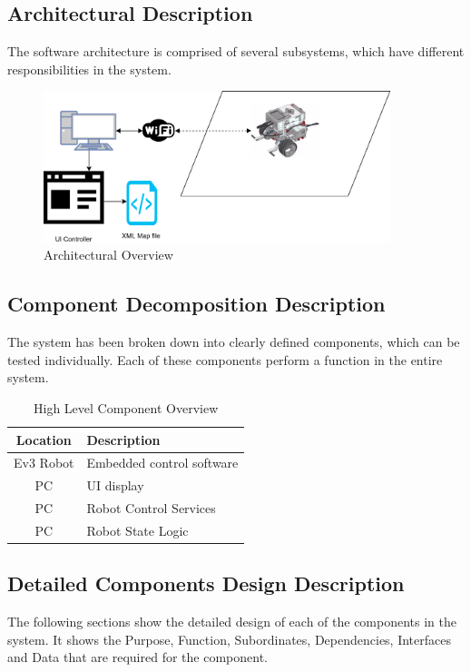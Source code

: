 \subsection{Architectural Description}
The software architecture is comprised of several subsystems, which have different responsibilities in the system.

\begin{figure}[H]
	\centering
	\includegraphics[width=0.9\textwidth]{Robot_system.png}
	\caption{\label{fig:robotSystem} Architectural Overview}
\end{figure}

\subsection{Component Decomposition Description}
The system has been broken down into clearly defined components, which can be tested individually. Each of these components perform a function in the entire system.

\begin{table}[H]
\centering
\begin{tabular}{|c|l|}
	\hline
	\bf{Location} & \bf{Description} \\
	\hline
	\hline
	Ev3 Robot & Embedded control software \\
	\hline
	PC & UI display \\
	\hline
	PC & Robot Control Services \\
	\hline
	PC & Robot State Logic \\
	\hline
\end{tabular}
\caption{\label{fig:compHigh}High Level Component Overview}
\end{table}

\subsection{Detailed Components Design Description}\label{detailedSection}
The following sections show the detailed design of each of the components in the system. It shows the Purpose, Function, Subordinates, Dependencies, Interfaces and Data that are required for the component.

